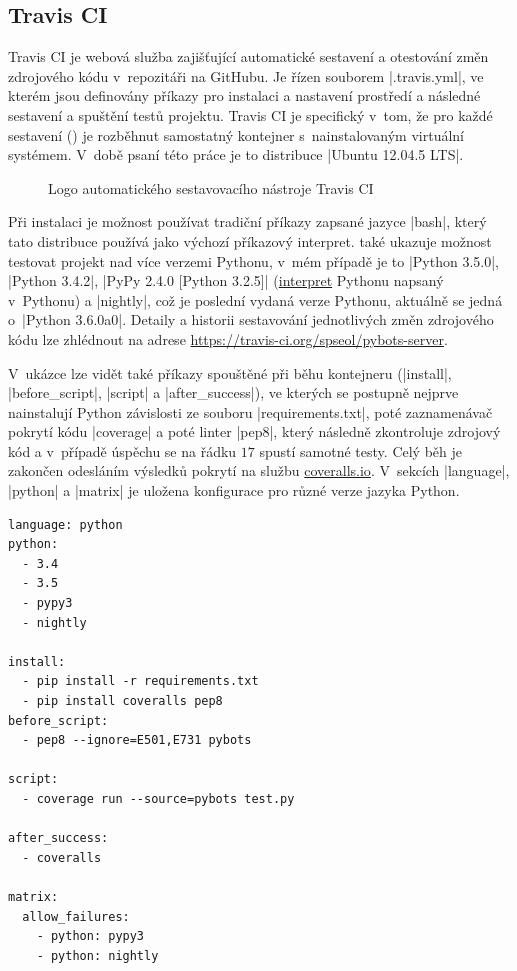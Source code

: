 \subsection{Travis CI}
\label{subsec:travis-ci}

Travis CI je webová služba zajišťující automatické sestavení a otestování změn zdrojového kódu v~repozitáři na GitHubu. Je řízen souborem \ic|.travis.yml|\cite{travis-docs}, ve kterém jsou definovány příkazy pro instalaci a nastavení prostředí a následné sestavení a spuštění testů projektu. Travis CI je specifický v~tom, že pro každé sestavení () je rozběhnut samostatný kontejner s~nainstalovaným virtuální systémem. V~době psaní této práce je to distribuce \ic|Ubuntu 12.04.5 LTS|. 

\begin{figure}
	\centering
	
	\caption{Logo automatického sestavovacího nástroje Travis CI}
\end{figure}

Při instalaci je možnost používat tradiční příkazy zapsané jazyce \ic|bash|, který tato distribuce používá jako výchozí příkazový interpret.  také ukazuje možnost testovat projekt nad více verzemi Pythonu, v~mém případě je to \ic|Python 3.5.0|, \ic|Python 3.4.2|, \ic|PyPy 2.4.0 [Python 3.2.5]| (\href{http://pypy.org/}{interpret} Pythonu napsaný v~Pythonu) a \ic|nightly|, což je poslední vydaná verze Pythonu, aktuálně se jedná o~\ic|Python 3.6.0a0|. Detaily a historii sestavování jednotlivých změn zdrojového kódu lze zhlédnout na adrese \url{https://travis-ci.org/spseol/pybots-server}.

V~ukázce lze vidět také příkazy spouštěné při běhu kontejneru (\ic|install|, \ic|before_script|, \ic|script| a \ic|after_success|), ve kterých se postupně nejprve nainstalují Python závislosti ze souboru \ic|requirements.txt|, poté zaznamenávač pokrytí kódu \ic|coverage| a poté linter \ic|pep8|, který následně zkontroluje zdrojový kód a v~případě úspěchu se na řádku $17$ spustí samotné testy. Celý běh je zakončen odesláním výsledků pokrytí na službu \href{https://coveralls.io/}{coveralls.io}. V~sekcích \ic|language|, \ic|python| a \ic|matrix| je uložena konfigurace pro různé verze jazyka Python.

\begin{lstlisting}[caption={Zkrácená ukázka konfiguračního soubotu .travis.yml},label={lst:travis-yml},keywords={}]
language: python
python:
  - 3.4
  - 3.5
  - pypy3
  - nightly

install:
  - pip install -r requirements.txt
  - pip install coveralls pep8
before_script:
  - pep8 --ignore=E501,E731 pybots
  
script:
  - coverage run --source=pybots test.py

after_success:
  - coveralls

matrix:
  allow_failures:
    - python: pypy3
    - python: nightly
\end{lstlisting}


